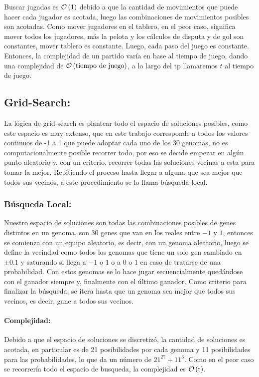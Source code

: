 Buscar jugadas es $\mathcal{O}\left(1\right)$ debido a que la cantidad de movimientos que puede
hacer cada jugador es acotada, luego las combinaciones de movimientos posibles
son acotadas. Como mover jugadores en el tablero, en el peor caso, significa
mover todos los jugadores, más la pelota y los cálculos de disputa y de gol son
constantes, mover tablero es constante. Luego, cada paso del juego es constante.
Entonces, la complejidad de un partido varía en base al tiempo de juego, dando
una complejidad de $\mathcal{O}\left(\textrm{tiempo de juego}\right)$, a lo largo del tp
llamaremos $t$ al tiempo de juego.

\subsection{Grid-Search:}

La lógica de grid-search es plantear todo el espacio de soluciones posibles,
como este espacio es muy extenso, que en este trabajo corresponde a todos los
valores continuos de -1 a 1 que puede adoptar cada uno de los 30 genomas, no es
computacionalmente posible recorrer todo, por eso se decide empezar en algún
punto aleatorio y, con un criterio, recorrer todas las soluciones vecinas a esta
para tomar la mejor. Repitiendo el proceso hasta llegar a alguna que sea mejor que
todos sus vecinos, a este procedimiento se lo llama búsqueda local.


\subsubsection{Búsqueda Local:}


Nuestro espacio de soluciones son todas las combinaciones posibles de genes
distintos en un genoma, son 30 genes que van en los reales entre $-1$ y $1$,
entonces se comienza con un equipo aleatorio, es decir, con un genoma aleatorio,
luego se define la vecindad como todos los genomas que tiene un solo gen
cambiado en $\pm 0.1$ y saturando si llega a $-1$ o $1$ o a $0$ o $1$ en caso de
tratarse de una probabilidad. Con estos genomas se lo hace jugar secuencialmente
quedándose con el ganador siempre y, finalmente con el último ganador. Como
criterio para finalizar la búsqueda, se itera hasta que un genoma sea
mejor que todos sus vecinos, es decir, gane a todos sus vecinos.

\paragraph{Complejidad:} Debido a que el espacio de soluciones se discretizó, la
cantidad de soluciones es acotada, en particular es de 21 posibilidades por cada
genoma y 11 posibilidades para las probabilidades, lo que da un número de
$21^{27}+11^3$. Como en el peor caso se recorrería todo el espacio de busqueda,
la complejidad es $\mathcal{O}\left(\textrm{t}\right)$.

